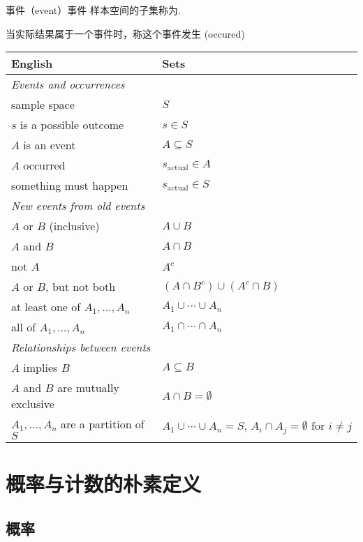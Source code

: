 \begin{definition}{事件（event）}{事件}
    样本空间的子集称为.
    
    当实际结果属于一个事件时，称这个事件发生 (occured)
\end{definition}


\begin{tabular}{ll}
    \toprule
    \textbf{English} & \textbf{Sets} \\
    \midrule
    \textit{Events and occurrences} & \\
    sample space & \(S\) \\
    \(s\) is a possible outcome & \(s \in S\) \\
    \(A\) is an event & \(A \subseteq S\) \\
    \(A\) occurred & \(s_{\text{actual}} \in A\) \\
    something must happen & \(s_{\text{actual}} \in S\) \\
    \midrule
    \textit{New events from old events} & \\
    \(A\) or \(B\) (inclusive) & \(A \cup B\) \\
    \(A\) and \(B\) & \(A \cap B\) \\
    not \(A\) & \(A^c\) \\
    \(A\) or \(B\), but not both & \((A \cap B^c) \cup (A^c \cap B)\) \\
    at least one of \(A_1, \ldots, A_n\) & \(A_1 \cup \cdots \cup A_n\) \\
    all of \(A_1, \ldots, A_n\) & \(A_1 \cap \cdots \cap A_n\) \\
    \midrule
    \textit{Relationships between events} & \\
    \(A\) implies \(B\) & \(A \subseteq B\) \\
    \(A\) and \(B\) are mutually exclusive & \(A \cap B = \emptyset\) \\
    \(A_1, \ldots, A_n\) are a partition of \(S\) & \(A_1 \cup \cdots \cup A_n = S, \, A_i \cap A_j = \emptyset \text{ for } i \neq j\) \\
    \bottomrule
\end{tabular}

\newpage

\section{概率与计数的朴素定义}

\subsection{概率}


